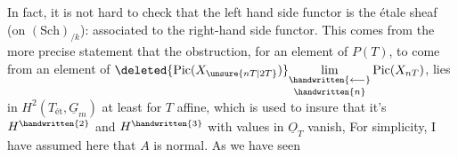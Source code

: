 In fact, it is not hard to check that the left hand side functor is the étale sheaf (on $(\mathrm{Sch})_{/k}$): associated to the  right-hand side functor. This comes from the more precise statement that the obstruction, for an element of $P(T)$, to come from an element of $\deleted{\operatorname{Pic}(X_{\unsure{nT|2T}})}\underset{\handwritten{n}}{\underset{\handwritten{\longleftarrow}}{\lim}}\operatorname{Pic}(X_{nT})$, lies in $H^2(T_{\text{ét}},\underline{G}_m)$ \handwritten{(} at least for $T$ affine, \handwritten{\unsure{(}}which is used to insure that it's $H^{\handwritten{2}}$ and $H^{\handwritten{3}}$ with values in $\underline{O}_T$ vanish\handwritten{\unsure{)}}, For simplicity, I have assumed here that $A$ is normal\handwritten{)}. As we have seen
